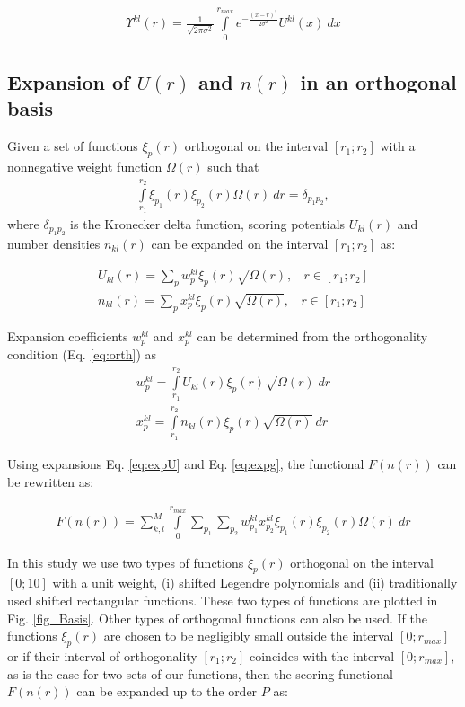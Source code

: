 \begin{eqnarray}
\label{eq:scoring_2}
 \Upsilon^{kl}(r) =\frac{1}{\sqrt{2\pi \sigma^2}}  \int \limits_{0}^{r_{max}} e^{-{\frac{(x-r)^2}{2\sigma^2}}} U^{kl}(x)~dx
\end{eqnarray}

\subsection{Expansion of $U(r)$ and $n(r)$ in an orthogonal basis}
Given a set of functions $\xi_p (r)$ orthogonal on the interval $[r_1;r_2]$ with a nonnegative weight function $\Omega(r)$ such that
\begin{eqnarray}
\int \limits_{r_1}^{r_2} \xi_{p_1}(r) \xi_{p_2}(r) \Omega(r)~dr = \delta_{p_1 p_2}
\label{eq:orth}
,
\end{eqnarray}
where $\delta_{p_1 p_2}$ is the Kronecker delta function, scoring potentials $U_{kl}(r)$ and number densities $n_{kl}(r)$ can be expanded on the interval $[r_1;r_2]$ as:

\begin{eqnarray}
\label{eq:expU}
U_{kl}(r)=\sum_p w_p^{kl} \xi_p (r) \sqrt{ \Omega(r)},~~~~r \in [r_1;r_2] \\
n_{kl}(r)=\sum_p x_p^{kl} \xi_p (r) \sqrt{ \Omega(r)},~~~~r \in [r_1;r_2]
\label{eq:expg}
\end{eqnarray}

Expansion coefficients $w_p^{kl}$ and $x_p^{kl}$ can be determined from the orthogonality condition (Eq. \ref{eq:orth}) as 
\begin{eqnarray}
w_p^{kl} = \int \limits_{r_1}^{r_2}U_{kl}(r) \xi_p (r) \sqrt{ \Omega(r)}~dr \\
x_p^{kl} = \int \limits_{r_1}^{r_2}n_{kl}(r) \xi_p (r) \sqrt{ \Omega(r)}~dr
\label{eq:projection}
\end{eqnarray}

Using expansions Eq. \ref{eq:expU} and Eq. \ref{eq:expg}, the functional $F(n(r))$ can be rewritten as:

\begin{eqnarray}
F(n(r))= \sum_{k,l}^M\int \limits_{0}^{r_{max}}  \sum_{p_1}\sum_{p_2}w_{p_1}^{kl}x_{p_2}^{kl}\xi_{p_1}(r)\xi_{p_2}(r) \Omega(r) ~dr
\end{eqnarray}

In this study we use two types of functions $\xi_p (r)$ orthogonal on the interval $[0;10]$  with a unit weight, 
(i) shifted Legendre polynomials and (ii) traditionally used shifted rectangular functions. These two types of functions are plotted in Fig. 
\ref{fig_Basis}. Other types of orthogonal functions can also be used. 
If the functions $\xi_p (r)$ are chosen to be negligibly small outside the interval $[0;r_{max}]$ or if their interval of orthogonality $[r_1;r_2]$ 
coincides with the interval $[0;r_{max}]$, as is the case for two sets of our functions, then the scoring functional $F(n(r))$ can be expanded up 
to the order $P$ as:

